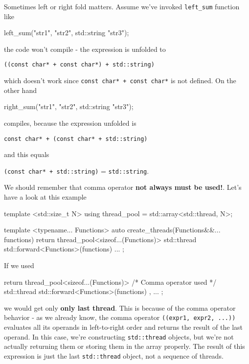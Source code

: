 \documentclass[../main]{subfiles}
\begin{document}
    Sometimes left or right fold matters. Assume we've invoked \texttt{left\_sum} function like
\begin{Code}
    left_sum("str1", "str2", std::string {"str3"});
\end{Code}
the code won't compile - the expression is unfolded to
\begin{center}
    \texttt{((const char* + const char*) + std::string)}
\end{center}
which doesn't work since \texttt{const char* + const char*} is not defined. On the other hand
\begin{Code}
    right_sum("str1", "str2", std::string {"str3"});
\end{Code}
compiles, because the expression unfolded is
\begin{center}
    \texttt{const char* + (const char* + std::string)}
\end{center}
and this equals
\begin{center}
    \texttt{(const char* + std::string)} = \texttt{std::string}.
\end{center}

We should remember that comma operator \textbf{not always must be used!}.
Let's have a look at this example
\begin{Code}
    template <std::size_t N>
    using thread_pool = std::array<std::thread, N>;
    
    template <typename... Functions>
    auto create_threads(Functions&&... functions)
    {
        return thread_pool<sizeof...(Functions)>
        {
            std::thread{ std::forward<Functions>(functions) }...
        };
    }
\end{Code}
\noindent
If we used
\begin{Code}
    return thread_pool<sizeof...(Functions)>
    {
        /* Comma operator used */
        std::thread{ std::forward<Functions>(functions) }, ...
    }; 
\end{Code}
we would get only \textbf{only last thread}. This is because of the comma
operator behavior - as we already know, the comma operator
\texttt{((expr1, expr2, ...))} evaluates all its operands
in left-to-right order and returns the result of the last operand.
In this case, we're constructing \texttt{std::thread} objects,
but we're not actually returning them or storing them in the array properly.
The result of this expression is just the last \texttt{std::thread} object,
not a sequence of threads.
\end{document}
